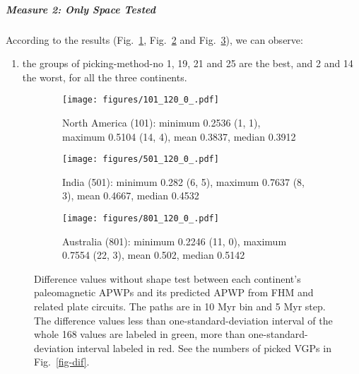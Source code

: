 \subparagraph{Measure 2: Only Space Tested}

According to the results (Fig.~\ref{fig-nant-dif}, Fig.~\ref{fig-indnt-dif} and
Fig.~\ref{fig-aunt-dif}), we can observe:
%
\begin{enumerate}
  \item the groups of picking-method-no 1, 19, 21 and 25 are the best, and 2
        and 14 the worst, for all the three continents.
\end{enumerate}

\begin{figure*}
	\centering
	\begin{subfigure}{1.01\textwidth}
		\texttt{[image: figures/101\_120\_0\_.pdf]}
		\caption{North America (101): minimum 0.2536 (1, 1), maximum 0.5104 (14, 4), mean 0.3837, median 0.3912}\label{fig-nant-dif}
	\end{subfigure}
	\vspace{.1em}
	\begin{subfigure}{1.01\textwidth}
		\texttt{[image: figures/501\_120\_0\_.pdf]}
		\caption{India (501): minimum 0.282 (6, 5), maximum 0.7637 (8, 3), mean 0.4667, median 0.4532}\label{fig-indnt-dif}
	\end{subfigure}
	\vspace{.1em}
	\begin{subfigure}{1.01\textwidth}
		\texttt{[image: figures/801\_120\_0\_.pdf]}
		\caption{Australia (801): minimum 0.2246 (11, 0), maximum 0.7554 (22, 3), mean 0.502, median 0.5142}\label{fig-aunt-dif}
	\end{subfigure}
	\caption[Differences without shape test of each plate's paleomagnetic APWPs
versus its FHM predicted APWP]{Difference values without shape test between each
continent's paleomagnetic APWPs and its predicted APWP from FHM and related
plate circuits. The paths are in 10 Myr bin and 5 Myr step. The difference
values less than one-standard-deviation interval of the whole 168 values are
labeled in green, more than one-standard-deviation interval labeled in red. See
the numbers of picked VGPs in Fig.~\ref{fig-dif}.}\label{fig-difnt}
\end{figure*}

